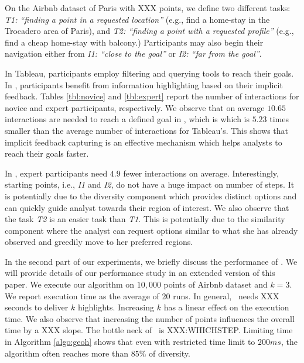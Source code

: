\vspace{2pt}
On the Airbnb dataset of Paris with XXX points, we define two different tasks: {\em T1: ``finding a point in a requested location''} (e.g., find a home-stay in the Trocadero area of Paris), and {\em T2: ``finding a point with a requested profile''} (e.g., find a cheap home-stay with balcony.) Participants may also begin their navigation either from {\em I1: ``close to the goal''} or {\em I2: ``far from the goal''}. 

\vspace{2pt}
In {\sc Tableau}, participants employ filtering and querying tools to reach their goals. In \sgg, participants benefit from information highlighting based on their implicit feedback. Tables \ref{tbl:novice} and \ref{tbl:expert} report the number of interactions for novice and expert participants, respectively. We observe that on average $10.65$ interactions are needed to reach a defined goal in \sgg, which is  which is $5.23$ times smaller than the average number of interactions for {\sc Tableau}'s. This shows that implicit feedback capturing is an effective mechanism which helps analysts to reach their goals faster.

\vspace{2pt}
In \sgg, expert participants need $4.9$ fewer interactions on average. Interestingly, starting points, i.e., {\em I1} and {\em I2}, do not have a huge impact on number of steps. It is potentially due to the diversity component which provides distinct options and can quickly guide analyst towards their region of interest. We also observe that the task {\em T2} is an easier task than {\em T1}. This is potentially due to the similarity component where the analyst can request options similar to what she has already observed and greedily move to her preferred regions.

\vspace{2pt}
In the second part of our experiments, we briefly discuss the performance of \sgg. We will provide details of our performance study in an extended version of this paper. We execute our algorithm on $10,000$ points of Airbnb dataset and $k=3$. We report execution time as the average of 20 runs. In general, \sgg\ needs XXX seconds to deliver $k$ highlights. Increasing $k$ has a linear effect on the execution time. We also observe that increasing the number of points influences the overall time by a XXX slope. The bottle neck of \sgg\ is XXX:WHICHSTEP. Limiting time in Algorithm \ref{algo:geoh} shows that even with restricted time limit to $200ms$, the algorithm often reaches more than $85\%$ of diversity.



